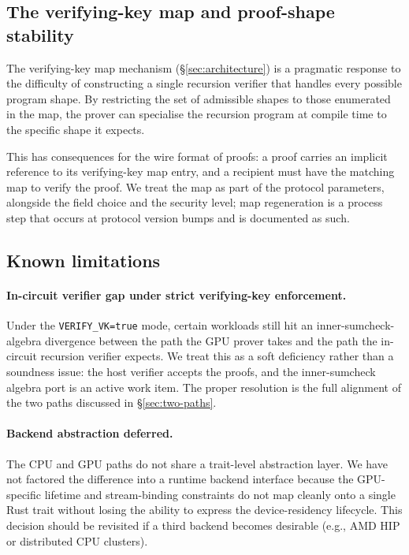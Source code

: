 \subsection{The verifying-key map and proof-shape stability}

The verifying-key map mechanism (\S\ref{sec:architecture}) is a pragmatic response to the difficulty of constructing a single recursion verifier that handles every possible program shape. By restricting the set of admissible shapes to those enumerated in the map, the prover can specialise the recursion program at compile time to the specific shape it expects.

This has consequences for the wire format of proofs: a proof carries an implicit reference to its verifying-key map entry, and a recipient must have the matching map to verify the proof. We treat the map as part of the protocol parameters, alongside the field choice and the security level; map regeneration is a process step that occurs at protocol version bumps and is documented as such.

\subsection{Known limitations}

\paragraph{In-circuit verifier gap under strict verifying-key enforcement.} Under the \texttt{VERIFY\_VK=true} mode, certain workloads still hit an inner-sumcheck-algebra divergence between the path the GPU prover takes and the path the in-circuit recursion verifier expects. We treat this as a soft deficiency rather than a soundness issue: the host verifier accepts the proofs, and the inner-sumcheck algebra port is an active work item. The proper resolution is the full alignment of the two paths discussed in \S\ref{sec:two-paths}.

\paragraph{Backend abstraction deferred.} The CPU and GPU paths do not share a trait-level abstraction layer. We have not factored the difference into a runtime backend interface because the GPU-specific lifetime and stream-binding constraints do not map cleanly onto a single Rust trait without losing the ability to express the device-residency lifecycle. This decision should be revisited if a third backend becomes desirable (e.g., AMD HIP or distributed CPU clusters).

